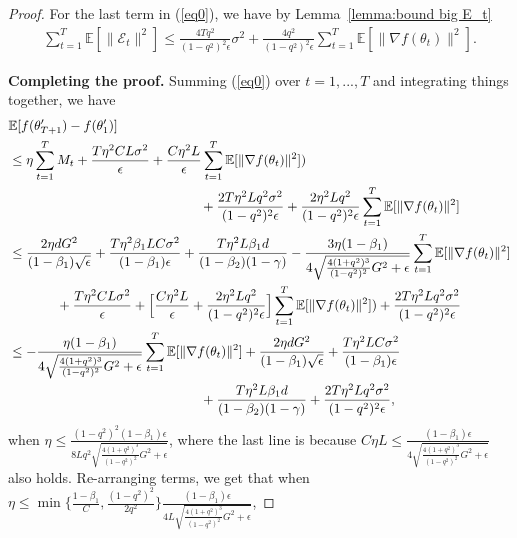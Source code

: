 \documentclass[11pt]{article}
\begin{document}
\begin{proof}
For the last term in (\ref{eq0}), we have by Lemma~\ref{lemma:bound big E_t}
\begin{align*}
    \sum_{t=1}^T \mathbb E[\|\mathcal E_t\|^2]\leq \frac{4Tq^2}{(1-q^2)^2\epsilon}\sigma^2 + \frac{4q^2}{(1-q^2)^2\epsilon} \sum_{t=1}^T \mathbb E[\|\nabla f(\theta_t)\|^2].
\end{align*}

\textbf{Completing the proof.} Summing (\ref{eq0}) over $t=1,...,T$ and integrating things together, we have
\begin{align*}
    &\mathbb E[f(\theta_{T+1}')-f(\theta_1')]\\
    &\leq \eta \sum_{t=1}^T M_t+\frac{T\eta^2 CL\sigma^2}{\epsilon}+\frac{C\eta^2 L}{\epsilon} \sum_{t=1}^T \mathbb E[\|\nabla f(\theta_t)\|^2])\\
    &\hspace{2in} +\frac{2T\eta^2L q^2\sigma^2}{(1-q^2)^2\epsilon}+ \frac{2\eta^2 L q^2}{(1-q^2)^2\epsilon} \sum_{t=1}^T \mathbb E[\|\nabla f(\theta_t)\|^2]\\
    &\leq \frac{2\eta dG^2}{(1-\beta_1)\sqrt\epsilon}+\frac{T\eta^2 \beta_1 LC\sigma^2}{(1-\beta_1)\epsilon}+\frac{T\eta^2 L\beta_1 d}{(1-\beta_2)(1-\gamma)}- \frac{3\eta(1-\beta_1)}{4\sqrt{\frac{4(1+q^2)^3}{(1-q^2)^2}G^2+\epsilon}}\sum_{t=1}^T \mathbb E[\|\nabla f(\theta_t)\|^2]\\
    &\hspace{0.5in} +\frac{T\eta^2 CL\sigma^2}{\epsilon}+\Big[\frac{C\eta^2 L}{\epsilon}+\frac{2\eta^2 L q^2}{(1-q^2)^2\epsilon} \Big] \sum_{t=1}^T \mathbb E[\|\nabla f(\theta_t)\|^2])+\frac{2T\eta^2L q^2\sigma^2}{(1-q^2)^2\epsilon}\\
    &\leq - \frac{\eta(1-\beta_1)}{4\sqrt{\frac{4(1+q^2)^3}{(1-q^2)^2}G^2+\epsilon}}\sum_{t=1}^T \mathbb E[\|\nabla f(\theta_t)\|^2]+\frac{2\eta dG^2}{(1-\beta_1)\sqrt\epsilon}+\frac{T\eta^2 LC\sigma^2}{(1-\beta_1)\epsilon}\\
    &\hspace{2in} +\frac{T\eta^2 L\beta_1 d}{(1-\beta_2)(1-\gamma)}+\frac{2T\eta^2L q^2\sigma^2}{(1-q^2)^2\epsilon},
\end{align*}
when $\eta\leq \frac{(1-q^2)^2(1-\beta_1)\epsilon}{8Lq^2\sqrt{\frac{4(1+q^2)^3}{(1-q^2)^2}G^2+\epsilon}}$, where the last line is because $C\eta L\leq \frac{(1-\beta_1)\epsilon}{4\sqrt{\frac{4(1+q^2)^3}{(1-q^2)^2}G^2+\epsilon}}$ also holds. Re-arranging terms, we get that when $\eta\leq \min\{\frac{1-\beta_1}{C},\frac{(1-q^2)^2}{2q^2}\}\frac{(1-\beta_1)\epsilon}{4L\sqrt{\frac{4(1+q^2)^3}{(1-q^2)^2}G^2+\epsilon}}$, 

\end{proof}
\end{document}
